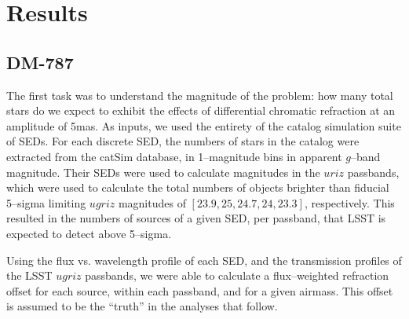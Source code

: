 \documentclass[DM,toc]{lsstdoc}
\begin{document}
\section{Results}

\subsection{DM-787}

The first task was to understand the magnitude of the problem: how
many total stars do we expect to exhibit the effects of differential
chromatic refraction at an amplitude of 5mas.  As inputs, we used the
entirety of the catalog simulation suite of SEDs.  For each discrete
SED, the numbers of stars in the catalog were extracted from the
catSim database, in 1--magnitude bins in apparent $g$--band magnitude.
Their SEDs were used to calculate magnitudes in the $uriz$ passbands,
which were used to calculate the total numbers of objects brighter
than fiducial 5--sigma limiting $ugriz$ magnitudes of $[23.9, 25,
  24.7, 24, 23.3]$, respectively.  This resulted in the numbers of
sources of a given SED, per passband, that LSST is expected to detect
above 5--sigma.

Using the flux vs. wavelength profile of each SED, and the
transmission profiles of the LSST $ugriz$ passbands, we were able to
calculate a flux--weighted refraction offset for each source, within
each passband, and for a given airmass.  This offset is assumed to be
the ``truth'' in the analyses that follow.
\end{document}
